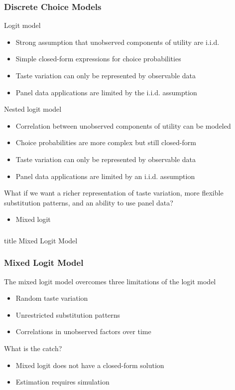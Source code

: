 \documentclass{beamer}
\begin{document}
\begin{frame}\frametitle{Discrete Choice Models}
    Logit model
    \begin{itemize}
        \item Strong assumption that unobserved components of utility are i.i.d.
        \item Simple closed-form expressions for choice probabilities
        \item Taste variation can only be represented by observable data
        \item Panel data applications are limited by the i.i.d. assumption
    \end{itemize}
    \vspace{2ex}
    Nested logit model
    \begin{itemize}
        \item Correlation between unobserved components of utility can be modeled
        \item Choice probabilities are more complex but still closed-form
        \item Taste variation can only be represented by observable data
        \item Panel data applications are limited by an i.i.d. assumption
    \end{itemize}
    \vspace{2ex}
    What if we want a richer representation of taste variation, more flexible substitution patterns, and an ability to use panel data?
    \begin{itemize}
        \item Mixed logit
    \end{itemize}
\end{frame}

\begin{frame}\frametitle{}
    \vfill
    \centering
    \begin{beamercolorbox}[center]{title}
        \Large Mixed Logit Model
    \end{beamercolorbox}
    \vfill
\end{frame}

\begin{frame}\frametitle{Mixed Logit Model}
    The mixed logit model overcomes three limitations of the logit model
    \begin{itemize}
        \item Random taste variation
        \item Unrestricted substitution patterns
        \item Correlations in unobserved factors over time
    \end{itemize}
    \vspace{3ex}
    What is the catch?
    \begin{itemize}
        \item Mixed logit does not have a closed-form solution
        \item Estimation requires simulation
    \end{itemize}
\end{frame}
\end{document}
